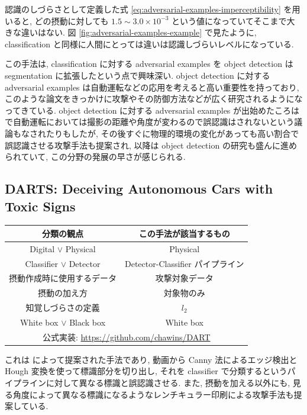 認識のしづらさとして定義した式 \ref{eq:adversarial-examples-imperceptibility} を用いると, どの摂動に対しても $1.5 \sim 3.0 \times 10^{-3}$ という値になっていてそこまで大きな違いはない.
図 \ref{fig:adversarial-examples-example} で見たように, classification と同様に人間にとっては違いは認識しづらいレベルになっている.

この手法は, classification に対する adversarial examples を object detection は segmentation に拡張したという点で興味深い.
object detection に対する adversarial examples は自動運転などの応用を考えると高い重要性を持っており, このような論文をきっかけに攻撃やその防御方法などが広く研究されるようになってきている.
object detection に対する adversarial examples が出始めたころは \cite{lu2017no} で自動運転においては撮影の距離や角度が変わるので誤認識はされないという議論もなされたりもしたが, その後すぐに物理的環境の変化があっても高い割合で誤認識させる攻撃手法も提案され, 以降は object detection の研究も盛んに進められていて, この分野の発展の早さが感じられる.



\subsection{DARTS: Deceiving Autonomous Cars with Toxic Signs}
\label{subsec:darts}
%
\begin{table}[htbp]
\begin{center}
\begin{tabular}{|c|c|}
\hline
分類の観点 & この手法が該当するもの \\
\hline
Digital $\lor$ Physical & Physical \\
Classifier $\lor$ Detector & Detector-Classifier パイプライン \\
摂動作成時に使用するデータ & 攻撃対象データ \\
摂動の加え方 & 対象物のみ \\
知覚しづらさの定義 & $l_2$ \\
White box $\lor$ Black box & White box \\
\hline
\multicolumn{2}{|c|}{公式実装: \href{https://github.com/chawins/DART}{https://github.com/chawins/DART}} \\
\hline
\end{tabular}
\label{tb:darts-summary}
\end{center}
\end{table}
%

これは \cite{sitawarin2018darts} によって提案された手法であり, 動画から Canny 法によるエッジ検出と Hough 変換を使って標識部分を切り出し, それを classifier で分類するというパイプラインに対して異なる標識と誤認識させる.
また, 摂動を加える以外にも, 見る角度によって異なる標識になるようなレンチキュラー印刷による攻撃手法も提案している.

